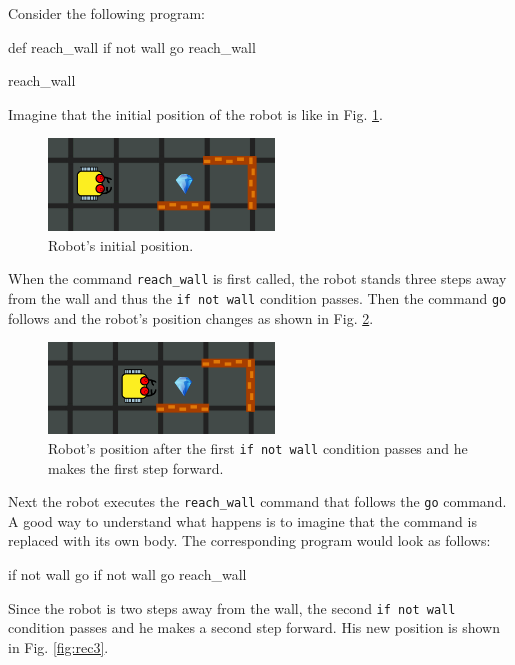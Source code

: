 Consider the following program:
\begin{bluecode}
def reach_wall
    if not wall
        go
        reach_wall

reach_wall
\end{bluecode}
\noindent
Imagine that the initial position of the robot is like in Fig. \ref{fig:rec1}.


\begin{figure}[!ht]
\begin{center}
\includegraphics[width=6cm]{imgk/rec-1.png}
\end{center}
\vspace{-4mm}
\caption{Robot's initial position.}
\label{fig:rec1}
\vspace{-4mm}
\end{figure}
\noindent
When the command {\tt reach\_wall} is first called, the robot stands three steps away from the wall and 
thus the {\tt if not wall} condition passes. Then the command {\tt go} follows and the robot's 
position changes as shown in Fig. \ref{fig:rec2}. 
\newpage

\begin{figure}[!ht]
\begin{center}
\includegraphics[width=6cm]{imgk/rec-2.png}
\end{center}
\vspace{-4mm}
\caption{Robot's position after the first {\tt if not wall} condition passes and he makes the first step forward.}
\label{fig:rec2}
\vspace{-4mm}
\end{figure}
\noindent
Next the robot executes the {\tt reach\_wall} command that follows the {\tt go} command. A good way to 
understand what happens is to imagine that the command is replaced with its own body. The corresponding 
program would look as follows:

\begin{bluecode}
if not wall
    go
    if not wall
        go
        reach_wall
\end{bluecode}
\noindent
Since the robot is two steps away from the wall, the second {\tt if not wall} condition passes and 
he makes a second step forward. His new position is shown in Fig. \ref{fig:rec3}.

